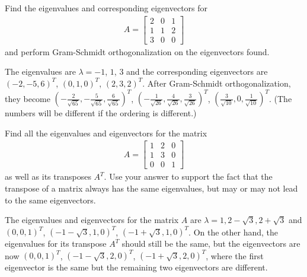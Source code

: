 \begin{Exercise}
Find the eigenvalues and corresponding eigenvectors for
\begin{align*}
A =
\begin{bmatrix}
2 & 0 & 1\\
1 & 1 & 2\\
3 & 0 & 0
\end{bmatrix}
\end{align*}
and perform Gram-Schmidt orthogonalization on the eigenvectors found.
\end{Exercise}
\begin{Answer}
The eigenvalues are $\lambda = -1$, $1$, $3$ and the corresponding eigenvectors are $(-2,-5,6)^T$, $(0,1,0)^T$, $(2,3,2)^T$. After Gram-Schmidt orthogonalization, they become $(-\frac{2}{\sqrt{65}}, -\frac{5}{\sqrt{65}}, \frac{6}{\sqrt{65}})^T$, $(-\frac{1}{\sqrt{26}}, \frac{4}{\sqrt{26}}, \frac{3}{\sqrt{26}})^T$, $(\frac{3}{\sqrt{10}}, 0, \frac{1}{\sqrt{10}})^T$. (The numbers will be different if the ordering is different.)
\end{Answer}

\begin{Exercise}
Find all the eigenvalues and eigenvectors for the matrix
\begin{align*}
A = \begin{bmatrix}
1 & 2 & 0 \\
1 & 3 & 0 \\
0 & 0 & 1
\end{bmatrix}
\end{align*}
as well as its transposes $A^T$. Use your answer to support the fact that the transpose of a matrix always has the same eigenvalues, but may or may not lead to the same eigenvectors.
\end{Exercise}
\begin{Answer}
The eigenvalues and eigenvectors for the matrix $A$ are $\lambda = 1, 2-\sqrt{3}, 2+\sqrt{3}$ and $(0,0,1)^T$, $(-1-\sqrt{3}, 1, 0)^T$, $(-1+\sqrt{3}, 1, 0)^T$. On the other hand, the eigenvalues for its transpose $A^T$ should still be the same, but the eigenvectors are now $(0,0,1)^T$, $(-1-\sqrt{3}, 2, 0)^T$, $(-1+\sqrt{3}, 2, 0)^T$, where the first eigenvector is the same but the remaining two eigenvectors are different.
\end{Answer}

